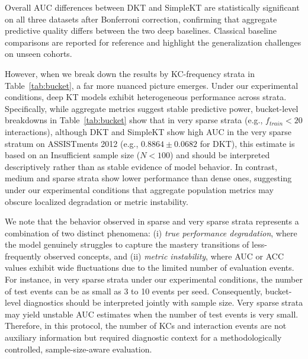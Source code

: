 



Overall AUC differences between DKT and SimpleKT are statistically significant on all three datasets after Bonferroni correction, confirming that aggregate predictive quality differs between the two deep baselines. Classical baseline comparisons are reported for reference and highlight the generalization challenges on unseen cohorts.

However, when we break down the results by KC-frequency strata in Table~\ref{tab:bucket}, a far more nuanced picture emerges. Under our experimental conditions, deep KT models exhibit heterogeneous performance across strata. Specifically, while aggregate metrics suggest stable predictive power, bucket-level breakdowns in Table~\ref{tab:bucket} show that in very sparse strata (e.g., $f_{train} < 20$ interactions), although DKT and SimpleKT show high AUC in the very sparse stratum on ASSISTments 2012 (e.g., $0.8864 \pm 0.0682$ for DKT), this estimate is based on an Insufficient sample size ($N < 100$) and should be interpreted descriptively rather than as stable evidence of model behavior. In contrast, medium and sparse strata show lower performance than dense ones, suggesting under our experimental conditions that aggregate population metrics may obscure localized degradation or metric instability.



We note that the behavior observed in sparse and very sparse strata represents a combination of two distinct phenomena: (i) \textit{true performance degradation}, where the model genuinely struggles to capture the mastery transitions of less-frequently observed concepts, and (ii) \textit{metric instability}, where AUC or ACC values exhibit wide fluctuations due to the limited number of evaluation events. For instance, in very sparse strata under our experimental conditions, the number of test events can be as small as 3 to 10 events per seed. Consequently, bucket-level diagnostics should be interpreted jointly with sample size. Very sparse strata may yield unstable AUC estimates when the number of test events is very small. Therefore, in this protocol, the number of KCs and interaction events are not auxiliary information but required diagnostic context for a methodologically controlled, sample-size-aware evaluation.

